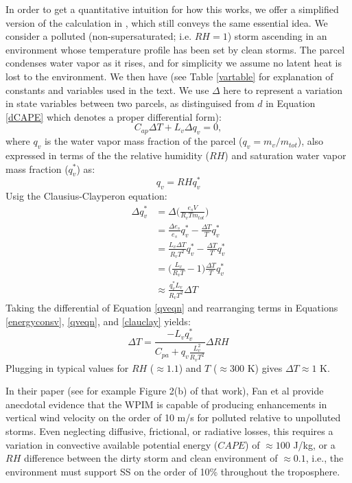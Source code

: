 \documentclass{article}
\begin{document}
In order to get a quantitative intuition for how this works, we offer a simplified version of the calculation in \cite{Grabowski2015}, which still conveys the same essential idea. We consider a polluted (non-supersaturated; i.e. $RH=1$) storm ascending in an environment whose temperature profile has been set by clean storms. The parcel condenses water vapor as it rises, and for simplicity we assume no latent heat is lost to the environment. We then have (see Table \ref{vartable} for explanation of constants and variables used in the text. We use $\Delta$ here to represent a variation in state variables between two parcels, as distinguised from $d$ in Equation \ref{dCAPE} which denotes a proper differential form):
\begin{equation}
\label{energyconsv}
C_{ap}\Delta T + L_v\Delta q_v = 0,
\end{equation}
where $q_v$ is the water vapor mass fraction of the parcel ($q_v=m_v/m_{tot}$), also expressed in terms of the the relative humidity ($RH$) and saturation water vapor mass fraction ($q_v^*$) as:
\begin{equation}
\label{qveqn}
q_v = RHq_v^*
\end{equation}
Usig the Clausius-Clayperon equation:
\begin{align}
\label{clauclay}
\Delta q_v^* &= \Delta \Big(\frac{e_sV}{R_vTm_{tot}}\Big)\nonumber\\ 
&=\frac{\Delta e_s}{e_s}q_v^* - \frac{\Delta T}{T}q_v^*\nonumber\\ 
&=\frac{L_v\Delta T}{R_vT^2}q_v^* - \frac{\Delta T}{T}q_v^*\nonumber\\ 
&=\Big(\frac{L_v}{R_vT} - 1\Big)\frac{\Delta T}{T}q_v^*\nonumber\\ 
&\approx \frac{q_v^*L_v}{R_vT^2}\Delta T 
\end{align}
Taking the differential of Equation \ref{qveqn} and rearranging terms in Equations \ref{energyconsv}, \ref{qveqn}, and \ref{clauclay} yields:
\begin{equation}
\label{dT}
\Delta T = \frac{-L_vq_v^*}{C_{pa} + q_v\frac{L_v^2}{R_vT^2}}\Delta RH
\end{equation}
Plugging in typical values for $RH$ ($\approx 1.1$) and $T$ ($\approx 300$ K) gives $\Delta T\approx 1$ K.

In their paper (see for example Figure 2(b) of that work), Fan et al provide anecdotal evidence that the WPIM is capable of producing enhancements in vertical wind velocity on the order of 10 m/s for polluted relative to unpolluted storms. Even neglecting diffusive, frictional, or radiative losses, this requires a variation in convective available potential energy ($CAPE$) of $\approx 100$ J/kg, or a $RH$ difference between the dirty storm and clean environment of $\approx 0.1$, i.e., the environment must support SS on the order of 10\% throughout the troposphere.
\end{document}
